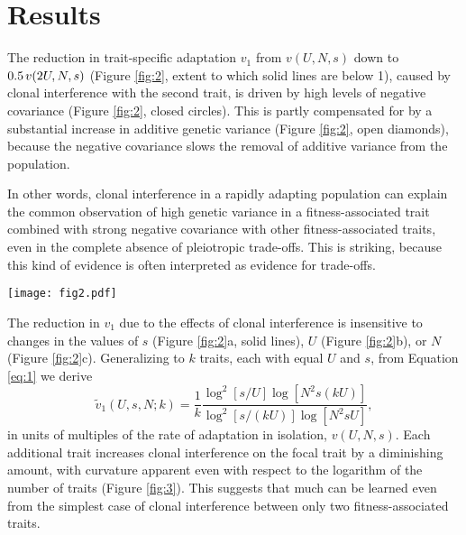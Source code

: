 \documentclass[9pt,twocolumn,twoside]{gsajnl}
\begin{document}
\section*{Results}
\label{sec:results}
The reduction in trait-specific adaptation $v_1$ from $v(U,N,s)$ down to $0.5 \hspace{.02 in} v(2U,N,s)$ (Figure \ref{fig:2}, extent to which solid lines are below 1), caused by clonal interference with the second trait, is driven by high levels of negative covariance (Figure \ref{fig:2}, closed circles). This is partly compensated for by a substantial increase in additive genetic variance (Figure \ref{fig:2}, open diamonds), because the negative covariance slows the removal of additive variance from the population. \par

In other words, clonal interference in a rapidly adapting population can explain the common observation of high genetic variance in a fitness-associated trait combined with strong negative covariance with other fitness-associated traits, even in the complete absence of pleiotropic trade-offs. This is striking, because this kind of evidence is often interpreted as evidence for trade-offs. \par

\begin{figure*}[!ht]
\centering
\texttt{[image: fig2.pdf]} 
\caption{Mean values in variance (open diamonds) of one trait and its covariance (closed circles) with the other, with their expected sum equal to the analytically calculated adaptation rate (solid line). Each average was calculated from one simulation that ran 1,000,000 generations. Variance of the focal trait is always higher than it would be in the absence of the second trait ($\sigma_1^2 >1$); negative covariance more than cancels this out ($|\sigma_{1,2}| > \sigma_1^2-1$) to reduce the adaptation rate.  Mean variance and covariance are insensitive to changes in the population size $N$ (c), but exhibit some dependence on the values of $s$ (a) and $U$ (b). For the parameter values not being varied on the x-axis, $s=0.02$, $U=10^{-5}$ and $N=10^9$. }\label{fig:2}
\end{figure*}

The reduction in $v_1$ due to the effects of clonal interference is insensitive to changes in the values of $s$ (Figure \ref{fig:2}a, solid lines),  $U$ (Figure \ref{fig:2}b), or $N$ (Figure \ref{fig:2}c). Generalizing to $k$ traits, each with equal $U$ and $s$, from Equation \eqref{eq:1}  we derive
\begin{equation}\label{eq:6}
 \tilde{v}_1 (U,s,N;k) 
= \frac{1}{k}\frac{\log^2[s/U]\log[N^2s(kU)]}{\log^2[s/(kU)]\log[N^2sU]},
\end{equation}
in units of multiples of the rate of adaptation in isolation, $v(U,N,s)$. Each additional trait increases clonal interference on the focal trait by a diminishing amount, with curvature apparent even with respect to the logarithm of the number of traits (Figure \ref{fig:3}). This suggests that much can be learned even from the simplest case of clonal interference between only two fitness-associated traits.\par
\end{document}
